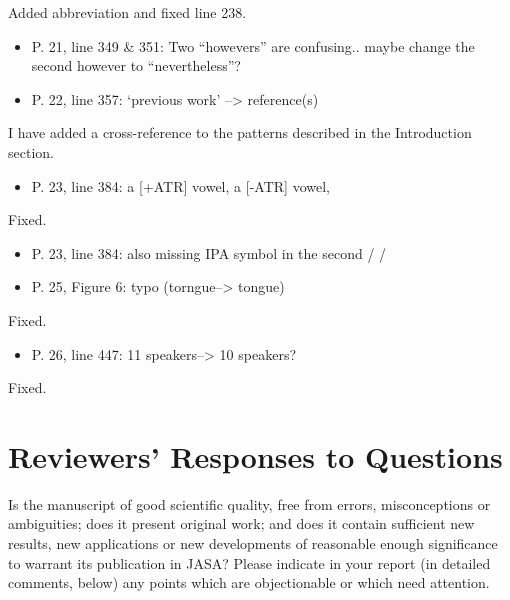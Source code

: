 \documentclass[]{article}
\providecommand{\tightlist}{%
  \setlength{\itemsep}{0pt}\setlength{\parskip}{0pt}}
\begin{document}
\color{plum}

Added abbreviation and fixed line 238. \color{black}

\begin{itemize}
\item
  P. 21, line 349 \& 351: Two ``howevers'' are confusing.. maybe change
  the second however to ``nevertheless''?
\item
  P. 22, line 357: `previous work' --\textgreater{} reference(s)
\end{itemize}

\color{plum}

I have added a cross-reference to the patterns described in the
Introduction section. \color{black}

\begin{itemize}
\tightlist
\item
  P. 23, line 384: a {[}+ATR{]} vowel, a {[}-ATR{]} vowel,
\end{itemize}

\color{plum}

Fixed. \color{black}

\begin{itemize}
\item
  P. 23, line 384: also missing IPA symbol in the second / /
\item
  P. 25, Figure 6: typo (torngue--\textgreater{} tongue)
\end{itemize}

\color{plum}

Fixed. \color{black}

\begin{itemize}
\tightlist
\item
  P. 26, line 447: 11 speakers--\textgreater{} 10 speakers?
\end{itemize}

\color{plum}

Fixed. \color{black}

\hypertarget{reviewers-responses-to-questions}{%
\section{Reviewers' Responses to
Questions}\label{reviewers-responses-to-questions}}

Is the manuscript of good scientific quality, free from errors,
misconceptions or ambiguities; does it present original work; and does
it contain sufficient new results, new applications or new developments
of reasonable enough significance to warrant its publication in JASA?
Please indicate in your report (in detailed comments, below) any points
which are objectionable or which need attention.
\end{document}
